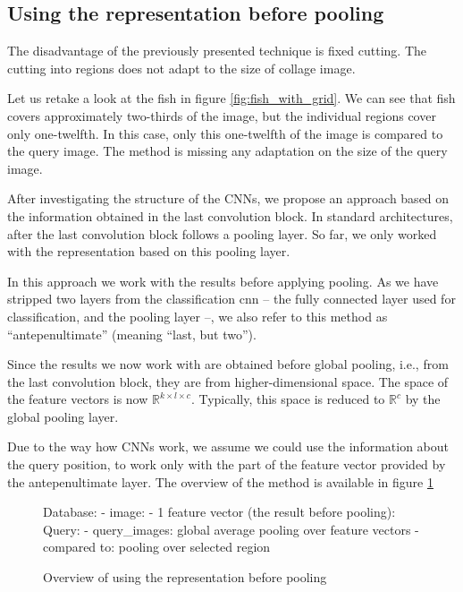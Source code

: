 
\subsection{Using the representation before pooling}

The disadvantage of the previously presented technique is fixed cutting. The cutting into regions does not adapt to the size of collage image. 

Let us retake a look at the fish in figure \ref{fig:fish_with_grid}. We can see that fish covers approximately two-thirds of the image, but the individual regions cover only one-twelfth. In this case, only this one-twelfth of the image is compared to the query image. The method is missing any adaptation on the size of the query image.

After investigating the structure of the CNNs, we propose an approach based on the information obtained in the last convolution block. In standard architectures, after the last convolution block follows a pooling layer. So far, we only worked with the representation based on this pooling layer.

In this approach we work with the results before applying pooling. As we have stripped two layers from the classification \acrshort{cnn} -- the fully connected layer used for classification, and the pooling layer --, we also refer to this method as ``antepenultimate'' (meaning ``last, but two'').

Since the results we now work with are obtained before global pooling, i.e., from the last convolution block, they are from higher-dimensional space. The space of the feature vectors is now $\mathbb{R}^{k\times l \times c}$. Typically, this space is reduced to $\mathbb{R}^c$ by the global pooling layer.

Due to the way how CNNs work, we assume we could use the information about the query position, to work only with the part of the feature vector provided by the antepenultimate layer. The overview of the method is available in figure \ref{fig:antepenultimate_overview}

\begin{figure}
\centering
\begin{boxedverbatim}
Database:
    - image:
        - 1 feature vector (the result before pooling):
Query:
    - query_images: global average pooling over feature vectors
    - compared to: pooling over selected region
\end{boxedverbatim}
\caption{Overview of using the representation before pooling}
\label{fig:antepenultimate_overview}
\end{figure}



